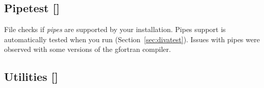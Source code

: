 \subsection[Pipetest]{Pipetest []}

File  checks if \textit{pipes} are supported by your \diva installation. Pipes support is automatically tested when you run  (Section~\ref{sec:divatest}). Issues with pipes were observed with some versions of the gfortran compiler.

\subsection[Utilities]{Utilities []}

